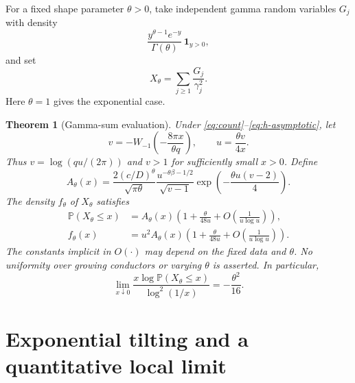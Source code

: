 \documentclass[11pt]{article}
\newtheorem{theorem}{Theorem}[section]
\theoremstyle{remark}\newtheorem{remark}[theorem]{Remark}
\newcommand{\Prob}{\mathbb P}
\newcommand{\asymerror}{O\!\left(\frac1{u\log u}\right)}
\begin{document}
For a fixed shape parameter $\theta>0$, take independent gamma random
variables $G_j$ with density
\[
 \frac{y^{\theta-1}e^{-y}}{\Gamma(\theta)}\,\mathbf1_{y>0},
\]
and set
\begin{equation}\label{eq:clock}
 X_\theta=\sum_{j\geq1}\frac{G_j}{\gamma_j^2}.
\end{equation}
Here $\theta=1$ gives the exponential case.

\begin{theorem}[Gamma-sum evaluation]\label{thm:abstract}
Under \eqref{eq:count}--\eqref{eq:h-asymptotic}, let
\begin{equation}\label{eq:general-saddle}
 v=-W_{-1}\!\left(-\frac{8\pi x}{\theta q}\right),
 \qquad u=\frac{\theta v}{4x}.
\end{equation}
Thus $v=\log(qu/(2\pi))$ and $v>1$ for sufficiently small $x>0$.
Define
\begin{equation}\label{eq:general-A}
 A_\theta(x)=
 \frac{2(c/D)^\theta}{\sqrt{\pi\theta}}
 \frac{u^{-\theta\beta-1/2}}{\sqrt{v-1}}
 \exp\!\left(-\frac{\theta u(v-2)}4\right).
\end{equation}
The density $f_\theta$ of $X_\theta$ satisfies
\begin{align}
 \Prob(X_\theta\leq x)
 &=A_\theta(x)\left(1+\frac{\theta}{48u}
                         +\asymerror\right),\label{eq:general-cdf}\\
 f_\theta(x)
 &=u^2A_\theta(x)\left(1+\frac{\theta}{48u}
                         +\asymerror\right).\label{eq:general-density}
\end{align}
The constants implicit in $O(\cdot)$ may depend on the fixed data and
$\theta$. No uniformity over growing conductors or varying $\theta$ is
asserted. In particular,
\[
 \lim_{x\downarrow0}
 \frac{x\log\Prob(X_\theta\leq x)}{\log^2(1/x)}
 =-\frac{\theta^2}{16}.
\]
\end{theorem}

\section{Exponential tilting and a quantitative local limit}
\end{document}
